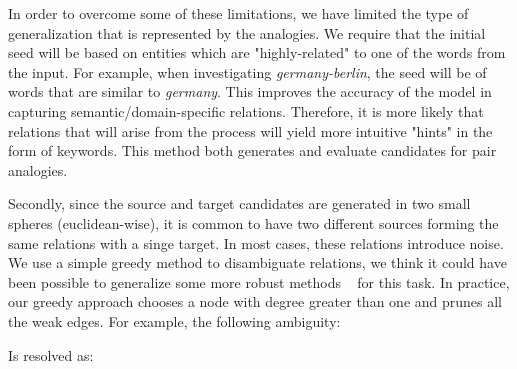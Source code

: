 \documentclass[11pt,a4paper]{article}
\begin{document}
In order to overcome some of these limitations, we have limited the type of generalization that is represented by the analogies. We require that the initial seed will be based on entities which are "highly-related" to one of the words from the input. For example, when investigating \textit{germany-berlin}, the seed will be of words that are similar to \textit{germany}. This improves the accuracy of the model in capturing semantic/domain-specific relations. Therefore, it is more likely that relations that will arise from the process will yield more intuitive "hints" in the form of keywords. This method both generates and evaluate candidates for pair analogies.

Secondly, since the source and target candidates are generated in two small spheres (euclidean-wise), it is common to have two different sources forming the same relations with a singe target. In most cases, these relations introduce noise. We use a simple greedy method to disambiguate relations, we think it could have been possible to generalize some more robust methods ~\cite{daelemans1999introduction} for this task. In practice, our greedy approach chooses a node with degree greater than one and prunes all the weak edges. For example, the following ambiguity:


Is resolved as:

\end{document}
